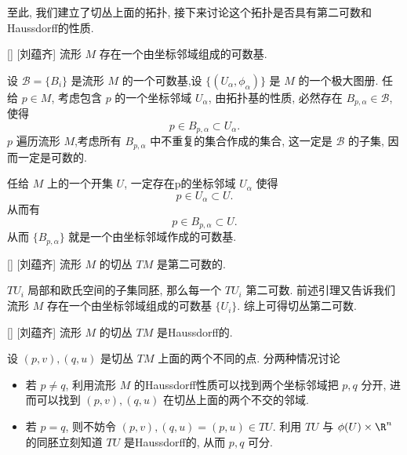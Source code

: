 \documentclass[UTF8]{ctexart}
\begin{document}
        至此, 我们建立了切丛上面的拓扑, 接下来讨论这个拓扑是否具有第二可数和Haussdorff的性质. 
        
        \begin{lma}
            []
            {}
            []
            [刘蕴齐]
            流形 \(M\) 存在一个由坐标邻域组成的可数基. 
        \end{lma}

        \begin{prf}
            设 \(\mathcal{B} = \{B_i\}\) 是流形 \(M\) 的一个可数基,设 \(\{(U_{\alpha}, \phi_{\alpha})\}\) 是 \(M\) 的一个极大图册. 
            任给 \(p \in M\), 考虑包含 \(p\) 的一个坐标邻域 \(U_{\alpha}\), 由拓扑基的性质, 必然存在 \(B_{p,\alpha} \in \mathcal{B}\), 使得
            \[
                p \in B_{p,\alpha} \subset U_{\alpha}.
            \]
             \(p\) 遍历流形 \(M\),考虑所有 \(B_{p,\alpha}\) 中不重复的集合作成的集合, 这一定是 \(\mathcal{B}\) 的子集, 因而一定是可数的. 

            任给 \(M\) 上的一个开集 \(U\), 一定存在p的坐标邻域 \(U_{\alpha}\) 使得
            \[
                p \in U_{\alpha} \subset U.
            \]
            从而有
            \[
                p \in B_{p,\alpha} \subset U.
            \]
            从而 \(\{B_{p,\alpha}\}\) 就是一个由坐标邻域作成的可数基. 
        \end{prf}

        \begin{ppt}
            []
            {}
            []
            [刘蕴齐]
            流形 \(M\) 的切丛 \(TM\) 是第二可数的. 
        \end{ppt}

        \begin{prf}
             \(T U_i\) 局部和欧氏空间的子集同胚, 那么每一个 \(T U_i\) 第二可数. 前述引理又告诉我们流形 \(M\) 存在一个由坐标邻域组成的可数基 \(\{U_i\}\). 综上可得切丛第二可数. 
        \end{prf}

        \begin{ppt}
            []
            {}
            []
            [刘蕴齐]
            流形 \(M\) 的切丛 \(TM\) 是Haussdorff的. 
        \end{ppt}

        \begin{prf}
            设 \((p,v), (q,u)\) 是切丛 \(TM\) 上面的两个不同的点. 分两种情况讨论
            \begin{itemize}
                \item 若 \(p \neq q\), 利用流形 \(M\) 的Haussdorff性质可以找到两个坐标邻域把 \(p,q\) 分开, 进而可以找到 \((p,v), (q,u)\) 在切丛上面的两个不交的邻域. 
                \item 若 \(p = q\), 则不妨令 \((p,v), (q,u)=(p,u) \in TU\). 利用 \(TU\) 与 \(\phi(U) \times \R^n\) 的同胚立刻知道 \(TU\) 是Haussdorff的, 从而 \(p, q\) 可分. 
            \end{itemize}
        \end{prf}
\end{document}
